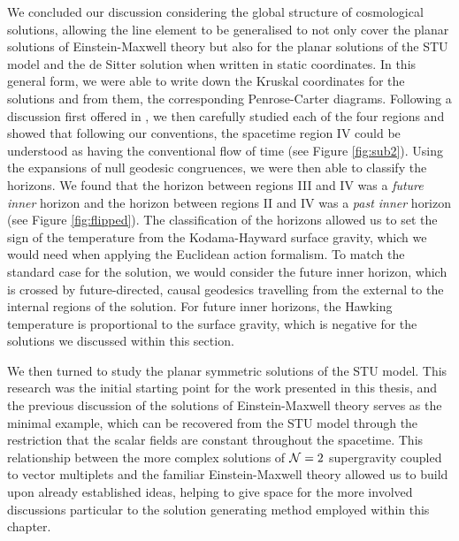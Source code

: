 We concluded our discussion considering the global structure of cosmological solutions, allowing the line element to be generalised to not only cover the planar solutions of Einstein-Maxwell theory but also for the planar solutions of the STU model and the de Sitter solution when written in static coordinates. In this general form, we were able to write down the Kruskal coordinates for the solutions and from them, the corresponding Penrose-Carter diagrams. Following a discussion first offered in \cite{Gutowski:2020fzb}, we then carefully studied each of the four regions and showed that following our conventions, the spacetime region IV could be understood as having the conventional flow of time (see Figure \ref{fig:sub2}). Using the expansions of null geodesic congruences, we were then able to classify the horizons. We found that the horizon between regions III and IV was a \emph{future inner} horizon and the horizon between regions II and IV was a \emph{past inner} horizon (see Figure \ref{fig:flipped}). The classification of the horizons allowed us to set the sign of the temperature from the Kodama-Hayward surface gravity, which we would need when applying the Euclidean action formalism. To match the standard case for the \sch solution, we would consider the future inner horizon, which is crossed by future-directed, causal geodesics travelling from the external to the internal regions of the solution. For future inner horizons, the Hawking temperature is proportional to the surface gravity, which is negative for the solutions we discussed within this section.  

We then turned to study the planar symmetric solutions of the STU model. This research was the initial starting point for the work presented in this thesis, and the previous discussion of the solutions of Einstein-Maxwell theory serves as the minimal example, which can be recovered from the STU model through the restriction that the scalar fields are constant throughout the spacetime. This relationship between the more complex solutions of ${\cal N} = 2$ supergravity coupled to vector multiplets and the familiar Einstein-Maxwell theory allowed us to build upon already established ideas, helping to give space for the more involved discussions particular to the solution generating method employed within this chapter.  

